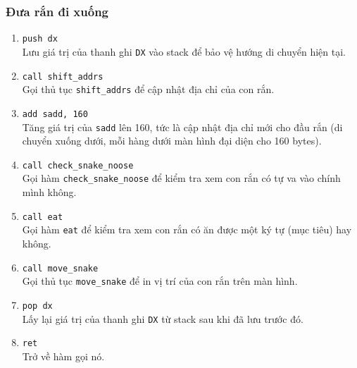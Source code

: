 \documentclass[12pt]{article}
\begin{document}
\subsubsection*{Đưa rắn đi xuống}
\begin{enumerate}[label=\textbf{\arabic*.}]
      \begin{figure}[H]
  \centering
  \texttt{[image: pics/md.png]}
\end{figure}
    \item \texttt{push dx} \\
    Lưu giá trị của thanh ghi \texttt{DX} vào stack để bảo vệ hướng di chuyển hiện tại.

    \item \texttt{call shift\_addrs} \\
    Gọi thủ tục \texttt{shift\_addrs} để cập nhật địa chỉ của con rắn.

    \item \texttt{add sadd, 160} \\
    Tăng giá trị của \texttt{sadd} lên 160, tức là cập nhật địa chỉ mới cho đầu rắn (di chuyển xuống dưới, mỗi hàng dưới màn hình đại diện cho 160 bytes).

    \item \texttt{call check\_snake\_noose} \\
    Gọi hàm \texttt{check\_snake\_noose} để kiểm tra xem con rắn có tự va vào chính mình không.

    \item \texttt{call eat} \\
    Gọi hàm \texttt{eat} để kiểm tra xem con rắn có ăn được một ký tự (mục tiêu) hay không.

    \item \texttt{call move\_snake} \\
    Gọi thủ tục \texttt{move\_snake} để in vị trí của con rắn trên màn hình.

    \item \texttt{pop dx} \\
    Lấy lại giá trị của thanh ghi \texttt{DX} từ stack sau khi đã lưu trước đó.

    \item \texttt{ret} \\
    Trở về hàm gọi nó.
\end{enumerate}
\end{document}
